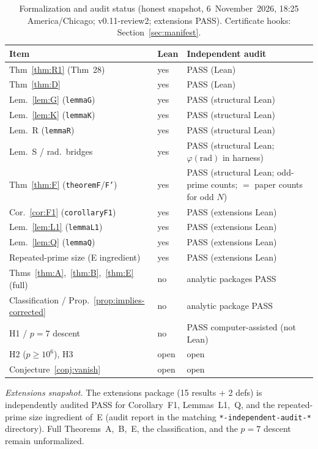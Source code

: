 \documentclass[11pt,reqno]{amsart}
\newcommand{\ph}{\varphi}
\theoremstyle{definition}
\begin{document}
\begin{table}[ht]
\centering
\caption{Formalization and audit status (honest snapshot, 6~November~2026, 18:25 America/Chicago; v0.11-review2; extensions PASS). Certificate hooks: Section~\ref{sec:manifest}.}
\label{tab:formalization}
{\footnotesize
\begin{tabular}{@{}p{4.1cm}p{1.6cm}p{5.6cm}@{}}
\toprule
Item & Lean & Independent audit \\
\midrule
Thm~\ref{thm:R1} (Thm~28) & yes & PASS (Lean) \\
Thm~\ref{thm:D} & yes & PASS (Lean) \\
Lem.~\ref{lem:G} (\texttt{lemmaG}) & yes & PASS (structural Lean) \\
Lem.~\ref{lem:K} (\texttt{lemmaK}) & yes & PASS (structural Lean) \\
Lem.~R (\texttt{lemmaR}) & yes & PASS (structural Lean) \\
Lem.~S / rad.\ bridges & yes & PASS (structural Lean; \(\ph(\mathrm{rad})\) in harness) \\
Thm~\ref{thm:F} (\texttt{theoremF}/\texttt{F'}) & yes & PASS (structural Lean; odd-prime counts; \(=\) paper counts for odd \(N\)) \\
Cor.~\ref{cor:F1} (\texttt{corollaryF1}) & yes & PASS (extensions Lean) \\
Lem.~\ref{lem:L1} (\texttt{lemmaL1}) & yes & PASS (extensions Lean) \\
Lem.~\ref{lem:Q} (\texttt{lemmaQ}) & yes & PASS (extensions Lean) \\
Repeated-prime size (E ingredient) & yes & PASS (extensions Lean) \\
Thms~\ref{thm:A},~\ref{thm:B},~\ref{thm:E} (full) & no & analytic packages PASS \\
Classification / Prop.~\ref{prop:implies-corrected} & no & analytic package PASS \\
H1 / \(p=7\) descent & no & PASS computer-assisted (not Lean) \\
H2 (\(p\ge 10^6\)), H3 & open & open \\
Conjecture~\ref{conj:vanish} & open & open \\
\bottomrule
\end{tabular}
}
\end{table}

\noindent\textit{Extensions snapshot.} The extensions package (15 results + 2 defs) is independently audited PASS for Corollary~F1, Lemmas~L1,~Q, and the repeated-prime size ingredient of~E (audit report in the matching \texttt{*-independent-audit-*} directory). Full Theorems~A,~B,~E, the classification, and the \(p=7\) descent remain unformalized.
\end{document}

